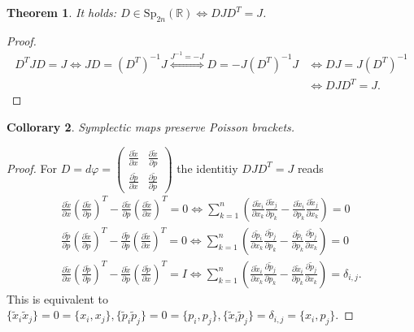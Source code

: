 \documentclass[hidelinks,a4paper, 11pt]{article}
\theoremstyle{plain}
\newtheorem{theorem}{Theorem}
\newtheorem{collorary}[theorem]{Collorary}
\theoremstyle{break}
\theoremstyle{plain}
\theoremstyle{definition}
\begin{document}
{\begin{theorem}
	It holds: $D \in \mathrm{Sp}_{2n}(\mathbb R) \iff DJD^T = J$.
\end{theorem}

\begin{proof}
	\begin{align*}
	D^TJD = J \iff JD = (D^T)^{-1}J \overset{J^{-1} = -J}{\iff} D = -J(D^T)^{-1}J &\iff DJ = J(D^T)^{-1} \\ &\iff DJD^T = J.
	\end{align*}
\end{proof}

\begin{collorary}
	Symplectic maps preserve Poisson brackets.
\end{collorary}
\begin{proof}
	For $D = d\varphi = \begin{pmatrix}
	\frac{\partial \tilde x}{\partial x} & \frac{\partial \tilde x}{\partial p} \\
	\frac{\partial \tilde p}{\partial x} & \frac{\partial \tilde p}{\partial p}
	\end{pmatrix}$ the identitiy $DJD^T = J$ reads
	\begin{align*}
	\frac{\partial \tilde x}{\partial x}(\frac{\partial \tilde x}{\partial p})^T - \frac{\partial \tilde x}{\partial p}(\frac{\partial \tilde x}{\partial x})^T = 0
	\iff \sum^n_{k=1}(\frac{\partial \tilde x_i}{\partial x_k} \frac{\partial \tilde x_j}{\partial p_k} - \frac{\partial \tilde x_i}{\partial p_k} \frac{\partial \tilde x_j}{\partial x_k}) = 0
	\\
	\frac{\partial \tilde p}{\partial p}(\frac{\partial \tilde x}{\partial p})^T - \frac{\partial \tilde p}{\partial p}(\frac{\partial \tilde x}{\partial x})^T = 0 
	\iff \sum^n_{k=1}(\frac{\partial \tilde p_i}{\partial x_k} \frac{\partial \tilde p_j}{\partial p_k} - \frac{\partial \tilde p_i}{\partial p_k} \frac{\partial \tilde p_j}{\partial x_k}) = 0
	\\
	\frac{\partial \tilde x}{\partial x}(\frac{\partial \tilde p}{\partial p})^T - \frac{\partial \tilde x}{\partial p}(\frac{\partial \tilde p}{\partial x})^T =  I 
	\iff \sum^n_{k=1}(\frac{\partial \tilde x_i}{\partial x_k} \frac{\partial \tilde p_j}{\partial p_k} - \frac{\partial \tilde x_i}{\partial p_k} \frac{\partial \tilde p_j}{\partial x_k}) = \delta_{i,j}.
	\end{align*}
	This is equivalent to $\{ \tilde x_i \tilde x_j \} = 0 = \{ x_i,x_j \}, \{ \tilde p_i \tilde p_j \} = 0 = \{ p_i,p_j \}, \{ \tilde x_i \tilde p_j \} = \delta_{i,j} = \{ x_i,p_j \}$.
\end{proof}

}
\end{document}
